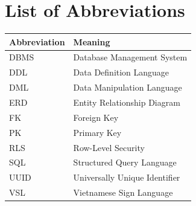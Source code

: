 \chapter*{List of Abbreviations}

\begin{longtable}{p{3cm}p{11cm}}
\toprule
\textbf{Abbreviation} & \textbf{Meaning} \\
\midrule
DBMS & Database Management System \\
DDL & Data Definition Language \\
DML & Data Manipulation Language \\
ERD & Entity Relationship Diagram \\
FK & Foreign Key \\
PK & Primary Key \\
RLS & Row-Level Security \\
SQL & Structured Query Language \\
UUID & Universally Unique Identifier \\
VSL & Vietnamese Sign Language \\
\bottomrule
\end{longtable}
